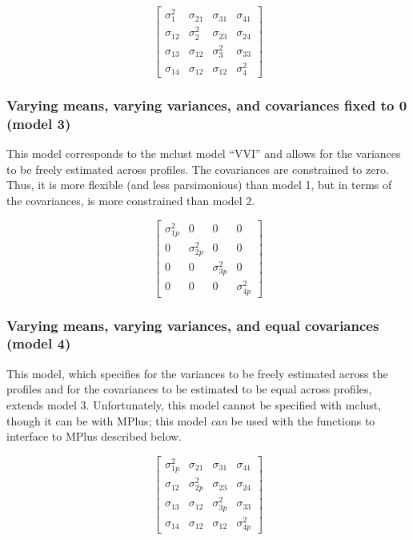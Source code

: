\documentclass[]{book}
\theoremstyle{definition}
\theoremstyle{definition}
\theoremstyle{definition}
\theoremstyle{remark}
\begin{document}
\[
\left[ \begin{matrix} { \sigma  }_{ 1 }^{ 2 } & { \sigma  }_{ 21 } & { \sigma  }_{ 31 } & { \sigma  }_{ 41 } \\ { \sigma  }_{ 12 } & { \sigma  }_{ 2 }^{ 2 } & { \sigma  }_{ 23 } & { \sigma  }_{ 24 } \\ { \sigma  }_{ 13 } & { \sigma  }_{ 12 } & { \sigma  }_{ 3 }^{ 2 } & { \sigma  }_{ 33 } \\ { \sigma  }_{ 14 } & { \sigma  }_{ 12 } & { \sigma  }_{ 12 } & { \sigma  }_{ 4 }^{ 2 } \end{matrix} \right] 
\]

\subsubsection{Varying means, varying variances, and covariances fixed
to 0 (model
3)}\label{varying-means-varying-variances-and-covariances-fixed-to-0-model-3}

This model corresponds to the mclust model ``VVI'' and allows for the
variances to be freely estimated across profiles. The covariances are
constrained to zero. Thus, it is more flexible (and less parsimonious)
than model 1, but in terms of the covariances, is more constrained than
model 2.

\[ 
\left[ \begin{matrix} { \sigma  }_{ 1p }^{ 2 } & 0 & 0 & 0 \\ 0 & { \sigma  }_{ 2p }^{ 2 } & 0 & 0 \\ 0 & 0 & { \sigma  }_{ 3p }^{ 2 } & 0 \\ 0 & 0 & 0 & { \sigma  }_{ 4p }^{ 2 } \end{matrix} \right] 
\]

\subsubsection{Varying means, varying variances, and equal covariances
(model
4)}\label{varying-means-varying-variances-and-equal-covariances-model-4}

This model, which specifies for the variances to be freely estimated
across the profiles and for the covariances to be estimated to be equal
across profiles, extends model 3. Unfortunately, this model cannot be
specified with mclust, though it can be with MPlus; this model
\emph{can} be used with the functions to interface to MPlus described
below.

\[
\left[ \begin{matrix} { \sigma  }_{ 1p }^{ 2 } & { \sigma  }_{ 21 } & { \sigma  }_{ 31 } & { \sigma  }_{ 41 } \\ { \sigma  }_{ 12 } & { \sigma  }_{ 2p }^{ 2 } & { \sigma  }_{ 23 } & { \sigma  }_{ 24 } \\ { \sigma  }_{ 13 } & { \sigma  }_{ 12 } & { \sigma  }_{ 3p }^{ 2 } & { \sigma  }_{ 33 } \\ { \sigma  }_{ 14 } & { \sigma  }_{ 12 } & { \sigma  }_{ 12 } & { \sigma  }_{ 4p }^{ 2 } \end{matrix} \right] 
\]
\end{document}
